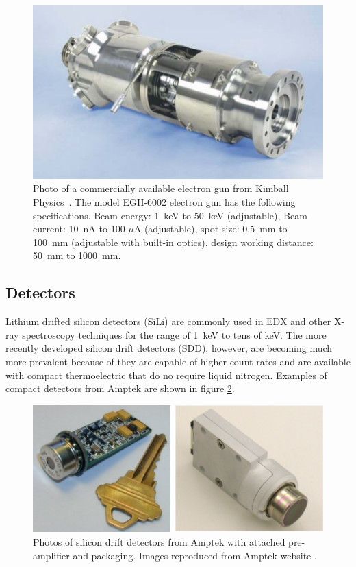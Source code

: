 \documentclass[12pt,letterpaper,final]{article}
\begin{document}
\begin{figure}[!h]
 \centering
  \includegraphics[width=\columnwidth]{figures/ElectronGunEGH6002.png}
 \caption{Photo of a commercially available electron gun from Kimball Physics~\cite{KimballPhysics}. The model EGH-6002 electron gun has the following specifications. Beam energy: 1~keV to 50~keV (adjustable), Beam current: 10~nA to 100 $\mu$A (adjustable), spot-size: 0.5~mm to 100~mm (adjustable with built-in optics), design working distance: 50~mm to 1000~mm.}
 \label{fig:ElectronGun}
\end{figure}

\subsection{Detectors}
\label{sec:detectors}
Lithium drifted silicon detectors (SiLi) are commonly used in EDX and other X-ray spectroscopy techniques for the range of 1~keV to tens of keV. The more recently developed silicon drift detectors (SDD), however, are becoming much more prevalent because of they are capable of higher count rates and are available with compact thermoelectric that do no require liquid nitrogen. Examples of compact detectors from Amptek \cite{Amptek} are shown in figure \ref{fig:AmptekDetectors}.

\begin{figure}[!h]
 \centering
  \includegraphics[width=\columnwidth]{figures/SDDPhoto_DoubleCol.pdf}
 \caption{Photos of silicon drift detectors from Amptek with attached pre-amplifier and packaging. Images reproduced from Amptek website \cite{Amptek}.}
 \label{fig:AmptekDetectors}
\end{figure}
\end{document}
